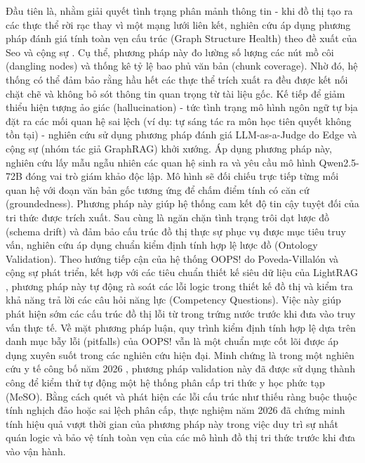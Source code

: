 Đầu tiên là, nhằm giải quyết tình trạng phân mảnh thông tin - khi đồ thị tạo ra các thực thể rời rạc thay vì một mạng lưới liên kết, nghiên cứu áp dụng phương pháp đánh giá tính toàn vẹn cấu trúc (Graph Structure Health) theo đề xuất của Seo và cộng sự \cite{seo2022structural}. Cụ thể, phương pháp này đo lường số lượng các nút mồ côi (dangling nodes) và thống kê tỷ lệ bao phủ văn bản (chunk coverage). Nhờ đó, hệ thống có thể đảm bảo rằng hầu hết các thực thể trích xuất ra đều được kết nối chặt chẽ và không bỏ sót thông tin quan trọng từ tài liệu gốc. Kế tiếp để giảm thiểu hiện tượng ảo giác (hallucination) - tức tình trạng mô hình ngôn ngữ tự bịa đặt ra các mối quan hệ sai lệch (ví dụ: tự sáng tác ra môn học tiên quyết không tồn tại) - nghiên cứu sử dụng phương pháp đánh giá LLM-as-a-Judge do Edge và cộng sự (nhóm tác giả GraphRAG) \cite{edge2024} khởi xướng. Áp dụng phương pháp này, nghiên cứu lấy mẫu ngẫu nhiên các quan hệ sinh ra và yêu cầu mô hình Qwen2.5-72B đóng vai trò giám khảo độc lập. Mô hình sẽ đối chiếu trực tiếp từng mối quan hệ với đoạn văn bản gốc tương ứng để chấm điểm tính có căn cứ (groundedness). Phương pháp này giúp hệ thống cam kết độ tin cậy tuyệt đối của tri thức được trích xuất. Sau cùng là ngăn chặn tình trạng trôi dạt lược đồ (schema drift) và đảm bảo cấu trúc đồ thị thực sự phục vụ được mục tiêu truy vấn, nghiên cứu áp dụng chuẩn kiểm định tính hợp lệ lược đồ (Ontology Validation). Theo hướng tiếp cận của hệ thống OOPS! do Poveda-Villalón và cộng sự \cite{poveda2014oops} phát triển, kết hợp với các tiêu chuẩn thiết kế siêu dữ liệu của LightRAG \cite{guo2025lightrag}, phương pháp này tự động rà soát các lỗi logic trong thiết kế đồ thị và kiểm tra khả năng trả lời các câu hỏi năng lực (Competency Questions). Việc này giúp phát hiện sớm các cấu trúc đồ thị lỗi từ trong trứng nước trước khi đưa vào truy vấn thực tế. Về mặt phương pháp luận, quy trình kiểm định tính hợp lệ dựa trên danh mục bẫy lỗi (pitfalls) của OOPS! vẫn là một chuẩn mực cốt lõi được áp dụng xuyên suốt trong các nghiên cứu hiện đại. Minh chứng là trong một nghiên cứu y tế công bố năm 2026 \cite{franco2026meso}, phương pháp validation này đã được sử dụng thành công để kiểm thử tự động một hệ thống phân cấp tri thức y học phức tạp (MeSO). Bằng cách quét và phát hiện các lỗi cấu trúc như thiếu ràng buộc thuộc tính nghịch đảo hoặc sai lệch phân cấp, thực nghiệm năm 2026 đã chứng minh tính hiệu quả vượt thời gian của phương pháp này trong việc duy trì sự nhất quán logic và bảo vệ tính toàn vẹn của các mô hình đồ thị tri thức trước khi đưa vào vận hành.

